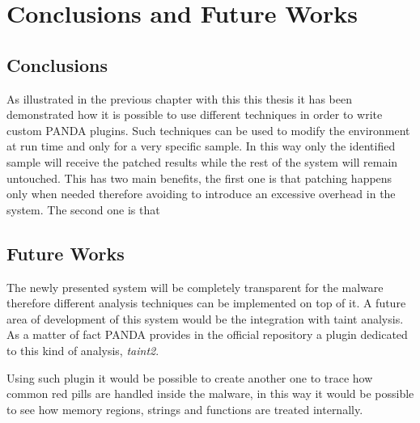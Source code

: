 \chapter{Conclusions and Future Works}
\label{chap:6}

\section{Conclusions}
As illustrated in the previous chapter with this this thesis it has been demonstrated how it is possible to use different techniques in order to write custom PANDA plugins. Such techniques can be used to modify the environment at run time and only for a very specific sample. In this way only the identified sample will receive the patched results while the rest of the system will remain untouched. This has two main benefits, the first one is that patching happens only when needed therefore avoiding to introduce an excessive overhead in the system. The second one is that 



\section{Future Works}

The newly presented system will be completely transparent for the malware therefore different analysis techniques can be implemented on top of it. A future area of development of this system would be the integration with taint analysis. As a matter of fact PANDA provides in the official repository a plugin dedicated to this kind of analysis, \textit{taint2}. 

Using such plugin it would be possible to create another one to trace how common red pills are handled inside the malware, in this way it would be possible to see how memory regions, strings and functions are treated internally.